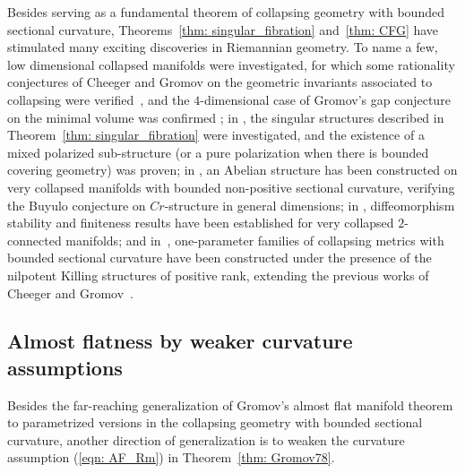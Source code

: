 \documentclass[10pt,a4paper]{amsart}
\numberwithin{equation}{section}
\begin{document}
Besides serving as a fundamental theorem of collapsing geometry with
bounded sectional curvature, Theorems~\ref{thm: singular_fibration} and~\ref{thm: CFG} have stimulated many exciting discoveries in Riemannian
geometry. To name a few, low dimensional collapsed manifolds were investigated,
for which some rationality conjectures of Cheeger and Gromov on the geometric
invariants associated to collapsing were verified~\cite{Rong93a, Rong95}, and
the $4$-dimensional case of Gromov's gap conjecture on the minimal volume was
confirmed \cite{Rong93b}; in \cite{CR95, CR96}, the singular structures
described in Theorem~\ref{thm: singular_fibration} were investigated, and the
existence of a mixed polarized sub-structure (or a pure polarization when there
is bounded covering geometry) was proven; in \cite{CCR01, CCR04}, an Abelian
structure has been constructed on very collapsed manifolds with bounded
non-positive sectional curvature, verifying the Buyulo conjecture
\cite{Buyalo90a, Buyalo90b} on $Cr$-structure in general dimensions; in
\cite{FR99, FR02, PRT99, PT99}, diffeomorphism stability and finiteness results
have been established for very collapsed $2$-connected manifolds; and in~\cite{CR09}, one-parameter families of collapsing metrics with bounded
sectional curvature have been constructed under the presence of the nilpotent
Killing structures of positive rank, extending the previous works of Cheeger
and Gromov~\cite{CGI}.

\subsection{Almost flatness by weaker curvature assumptions}\label{section2.2}
Besides the far-reaching generalization of Gromov's almost flat
manifold theorem to paramet\-ri\-zed versions in the collapsing geometry with
bounded sectional curvature, another direction of generalization is to weaken
the curvature assumption (\ref{eqn: AF_Rm}) in Theorem~\ref{thm: Gromov78}.
\end{document}
